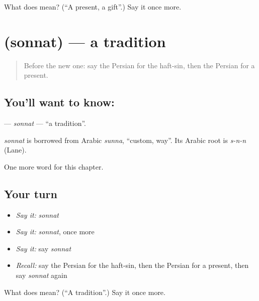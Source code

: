 \begin{tcolorbox}[breakable,colback=teal!4,colframe=teal!35!black,title={Before you move on}]
What does  mean? (\textquotedblleft{}A present, a gift\textquotedblright{}.) Say it once more.
\end{tcolorbox}
\section[\texorpdfstring{\fa{سنت} (sonnat)}{سنت (sonnat)}]{ (sonnat) — a tradition}

\label{lesson:FA-C207-sonnat}



\begin{quote}
Before the new one: say the Persian for the haft-sin, then the Persian for a present.
\end{quote}

\subsection*{You'll want to know: }
\textbf{} — \emph{sonnat} — \textquotedblleft{}a tradition\textquotedblright{}.

\begin{cousinweb}
\emph{sonnat} is borrowed from Arabic \emph{sunna}, \textquotedblleft{}custom, way\textquotedblright{}. Its Arabic root is \emph{s-n-n} (Lane).
\end{cousinweb}

\begin{grammarlens}[title={What you've built}]
One more word for this chapter.
\end{grammarlens}

\subsection*{Your turn}
\begin{itemize}
\raggedright
  \item \emph{Say it:} \emph{sonnat}
  \item \emph{Say it:} \emph{sonnat}, once more
  \item \emph{Say it:} say \emph{sonnat}
  \item \emph{Recall:} say the Persian for the haft-sin, then the Persian for a present, then say \emph{sonnat} again
\end{itemize}

\begin{tcolorbox}[breakable,colback=teal!4,colframe=teal!35!black,title={Before you move on}]
What does  mean? (\textquotedblleft{}A tradition\textquotedblright{}.) Say it once more.
\end{tcolorbox}
